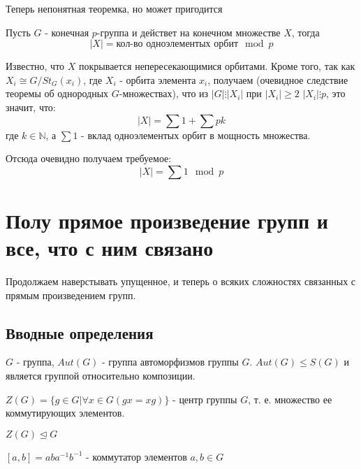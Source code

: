 Теперь непонятная теоремка, но может пригодится

\begin{Th}
Пусть $G$ - конечная $p$-группа и действет на конечном множестве $X$, тогда
\[
	\left|X\right| = \text{кол-во одноэлементых орбит} \mod p
\]
\end{Th}

\begin{Proof}
Известно, что $X$ покрывается непересекающимися орбитами. Кроме того, так как $X_i \cong G / St_G\left(x_i\right)$, где $X_i$ - орбита элемента $x_i$, получаем (очевидное следствие теоремы об однородных $G$-множествах), что из $\left|G\right| \vdots \left|X_i\right|$ при $\left|X_i\right| \ge 2$ $\left|X_i\right| \vdots p$, это значит, что:
\[
	\left|X\right| = \sum 1 + \sum p k
\]
где $k \in \mathbb{N}$, а $\sum 1$ - вклад одноэлементых орбит в мощность множества.

Отсюда очевидно получаем требуемое:
\[
	\left|X\right| = \sum 1 \mod p
\]
\end{Proof}

\chapter{Полу прямое произведение групп и все, что с ним связано}

Продолжаем наверстывать упущенное, и теперь о всяких сложностях связанных с прямым произведением групп.

\section{Вводные определения}

\begin{Def}
$G$ - группа, $Aut\left(G\right)$ - группа автоморфизмов группы $G$. $Aut\left(G\right) \le S\left(G\right)$ и является группой относительно композиции.
\end{Def}

\begin{Def}
$Z\left(G\right) = \lbrace g \in G | \forall x \in G \left(gx = xg\right)\rbrace$ - центр группы $G$, т. е. множество ее коммутирующих элементов.

$Z\left(G\right) \trianglelefteq G$
\end{Def}

\begin{Def}
$\left[a, b\right] = aba^{-1}b^{-1}$ - коммутатор элементов $a,b \in G$
\end{Def}

